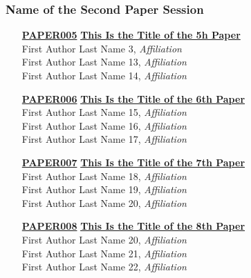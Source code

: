 \subsubsection{Name of the Second Paper Session}
\begin{enumerate}
\item[\href{https://doi.org/10.1145/1122445.1122456}{\textbf{PAPER005}}]
\href{https://doi.org/10.1145/1122445.1122456}{\textbf{This Is the Title of the 5h Paper}}\\
First Author Last Name 3, \emph{Affiliation}\\
First Author Last Name 13, \emph{Affiliation}\\
First Author Last Name 14, \emph{Affiliation}\\

\item[\href{https://doi.org/10.1145/1122445.1122456}{\textbf{PAPER006}}]
\href{https://doi.org/10.1145/1122445.1122456}{\textbf{This Is the Title of the 6th Paper}}\\
First Author Last Name 15, \emph{Affiliation}\\
First Author Last Name 16, \emph{Affiliation}\\
First Author Last Name 17, \emph{Affiliation}\\

\item[\href{https://doi.org/10.1145/1122445.1122456}{\textbf{PAPER007}}]
\href{https://doi.org/10.1145/1122445.1122456}{\textbf{This Is the Title of the 7th Paper}}\\
First Author Last Name 18, \emph{Affiliation}\\
First Author Last Name 19, \emph{Affiliation}\\
First Author Last Name 20, \emph{Affiliation}\\

\item[\href{https://doi.org/10.1145/1122445.1122456}{\textbf{PAPER008}}]
\href{https://doi.org/10.1145/1122445.1122456}{\textbf{This Is the Title of the 8th Paper}}\\
First Author Last Name 20, \emph{Affiliation}\\
First Author Last Name 21, \emph{Affiliation}\\
First Author Last Name 22, \emph{Affiliation}\\
\end{enumerate}


